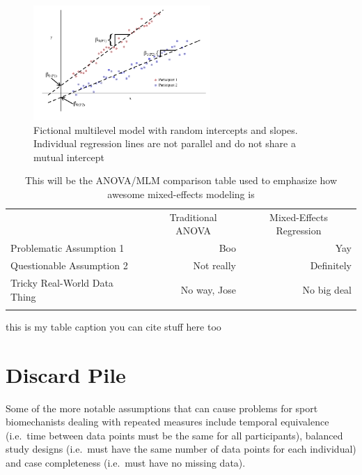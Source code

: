 \documentclass[
]{article}
\begin{document}
\begin{figure}
\centering
\captionsetup{width=0.6\textwidth}
\includegraphics[width=0.6\textwidth]{rand_int_slope.png}
\caption{Fictional multilevel model with random intercepts and slopes. Individual regression lines are not parallel and do not share a mutual intercept}
\label{fig-rand-int-slope}
\end{figure}

\begin{table}[H]
\begin{center}
\captionsetup{width=0.6\textwidth}
\begin{threeparttable}
\begin{tabular}{lrr}
\toprule
& \multicolumn{1}{c}{Traditional ANOVA} & \multicolumn{1}{c}{Mixed-Effects Regression} \\ 
\cline{2-3}
Problematic Assumption 1 & Boo & Yay \\
Questionable Assumption 2 & Not really & Definitely \\
Tricky Real-World Data Thing & No way, Jose & No big deal \\
\hhline{===}
\end{tabular}
\begin{tablenotes}[flushleft]
\scriptsize{\item this is my table caption you can cite stuff here too \cite{wasserberger2021}}
\end{tablenotes}
\caption{This will be the ANOVA/MLM comparison table used to emphasize how awesome mixed-effects modeling is}
\end{threeparttable}
\label{tbl:anova_mlm_comp}
\end{center}
\end{table}

\hypertarget{discard-pile}{%
\section{Discard Pile}\label{discard-pile}}

Some of the more notable assumptions that can cause problems for sport biomechanists dealing with repeated measures include temporal equivalence (i.e.~time between data points must be the same for all participants), balanced study designs (i.e.~must have the same number of data points for each individual) and case completeness (i.e.~must have no missing data).

\newpage
\singlespacing
{}


\end{document}
